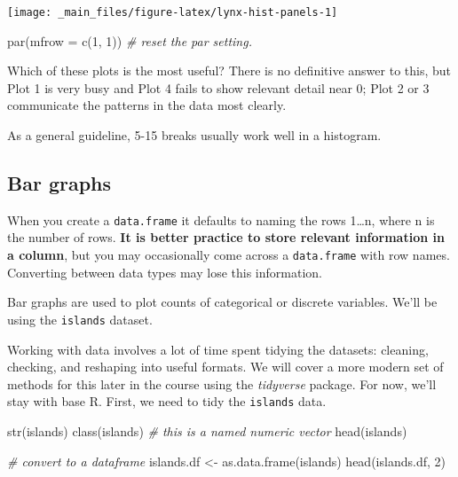 \documentclass[
  11pt,
  a4paper,
]{book}
\newenvironment{Shaded}{\begin{snugshade}}{\end{snugshade}}
\newcommand{\AttributeTok}[1]{\textcolor[rgb]{0.77,0.63,0.00}{#1}}
\newcommand{\CommentTok}[1]{\textcolor[rgb]{0.56,0.35,0.01}{\textit{#1}}}
\newcommand{\DecValTok}[1]{\textcolor[rgb]{0.00,0.00,0.81}{#1}}
\newcommand{\FunctionTok}[1]{\textcolor[rgb]{0.00,0.00,0.00}{#1}}
\newcommand{\NormalTok}[1]{#1}
\newcommand{\OtherTok}[1]{\textcolor[rgb]{0.56,0.35,0.01}{#1}}
\begin{document}
\begin{center}\texttt{[image: \_main\_files/figure-latex/lynx-hist-panels-1]} \end{center}

\begin{Shaded}
\begin{Highlighting}[]
\FunctionTok{par}\NormalTok{(}\AttributeTok{mfrow =} \FunctionTok{c}\NormalTok{(}\DecValTok{1}\NormalTok{, }\DecValTok{1}\NormalTok{)) }\CommentTok{\# reset the par setting.}
\end{Highlighting}
\end{Shaded}

Which of these plots is the most useful? There is no definitive answer to this, but Plot 1 is very busy and Plot 4 fails to show relevant detail near 0; Plot 2 or 3 communicate the patterns in the data most clearly.

As a general guideline, 5-15 breaks usually work well in a histogram.

\hypertarget{bar-graphs}{%
\subsection{Bar graphs}\label{bar-graphs}}

When you create a \texttt{data.frame} it defaults to naming the rows 1\ldots n, where n is the number of rows. \textbf{It is better practice to store relevant information in a column}, but you may occasionally come across a \texttt{data.frame} with row names. Converting between data types may lose this information.

Bar graphs are used to plot counts of categorical or discrete variables. We'll be using the \texttt{islands} dataset.

Working with data involves a lot of time spent tidying the datasets: cleaning, checking, and reshaping into useful formats. We will cover a more modern set of methods for this later in the course using the \emph{tidyverse} package. For now, we'll stay with base R. First, we need to tidy the \texttt{islands} data.

\begin{Shaded}
\begin{Highlighting}[]
\FunctionTok{str}\NormalTok{(islands) }
\FunctionTok{class}\NormalTok{(islands) }\CommentTok{\# this is a named numeric vector}
\FunctionTok{head}\NormalTok{(islands)}

\CommentTok{\# convert to a dataframe}
\NormalTok{islands.df }\OtherTok{\textless{}{-}} \FunctionTok{as.data.frame}\NormalTok{(islands) }
\FunctionTok{head}\NormalTok{(islands.df, }\DecValTok{2}\NormalTok{)}
\end{Highlighting}
\end{Shaded}
\end{document}
